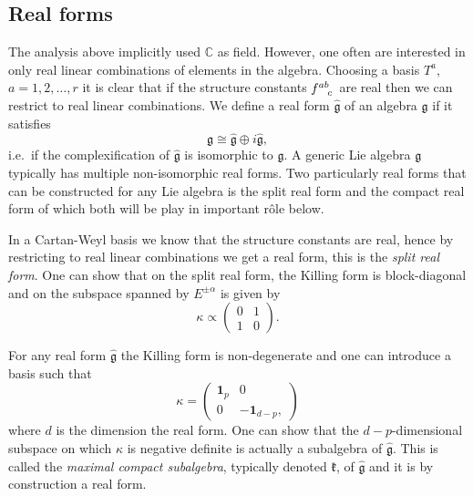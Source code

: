 \documentclass[11pt]{report}
\begin{document}
\subsection{Real forms}
The analysis above implicitly used $\mathbb{C}$ as field. However, one often are interested in only real linear combinations of elements in the algebra. Choosing a basis $T^a$, $a=1,2,\ldots, r$ it is clear that if the structure constants $\tensor{f}{^{ab}_c}$ are real then we can restrict to real linear combinations. We define a real form $\hat{\mathfrak{g}}$ of an algebra $\mathfrak{g}$ if it satisfies 
\begin{equation}
    \mathfrak{g} \cong \hat{\mathfrak{g}}\oplus i\hat{\mathfrak{g}},
\end{equation}
i.e.\ if the complexification of $\hat{\mathfrak{g}}$ is isomorphic to $\mathfrak{g}$. A generic Lie algebra $\mathfrak{g}$ typically has multiple non-isomorphic real forms. Two particularly real forms that can be constructed for any Lie algebra is the split real form and the compact real form of which both will be play in important rôle below. 

In a Cartan-Weyl basis we know that the structure constants are real, hence by restricting to real linear combinations we get a real form, this is the \emph{split real form}. One can show that on the split real form, the Killing form is block-diagonal and on the subspace spanned by $E^{\pm\alpha}$ is given by 
\begin{equation}
    \kappa \propto \begin{pmatrix} 0&1\\1&0\end{pmatrix}.
\end{equation}

For any real form $\hat{\mathfrak{g}}$ the Killing form is non-degenerate and one can introduce a basis such that 
\begin{equation}
    \kappa = \begin{pmatrix}\mathbf{1}_p& 0\\0&-\mathbf{1}_{d-p},
    \end{pmatrix}
\end{equation}
where $d$ is the dimension the real form. One can show that the $d-p$-dimensional subspace on which $\kappa$ is negative definite is actually a subalgebra of $\hat{\mathfrak{g}}$. This is called the \emph{maximal compact subalgebra}, typically denoted $\mathfrak{k}$, of $\hat{\mathfrak{g}}$ and it is by construction a real form.
\end{document}
